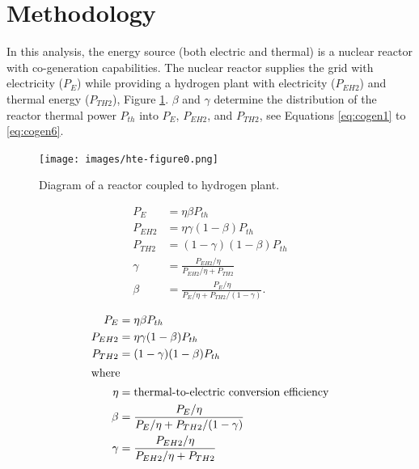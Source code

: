\documentclass[11pt,letterpaper]{article}
\begin{document}
\section{Methodology}
\label{sec:metho}

In this analysis, the energy source (both electric and thermal) is a nuclear reactor with co-generation capabilities.
The nuclear reactor supplies the grid with electricity ($P_E$) while providing a hydrogen plant with electricity ($P_{EH2}$) and thermal energy ($P_{TH2}$), Figure \ref{fig:cogen}.
$\beta$ and $\gamma$ determine the distribution of the reactor thermal power $P_{th}$ into $P_E$, $P_{EH2}$, and $P_{TH2}$, see Equations \ref{eq:cogen1} to \ref{eq:cogen6}.

\begin{figure}[htbp!]
	\centering
	\texttt{[image: images/hte-figure0.png]}
	\hfill
	\caption{Diagram of a reactor coupled to hydrogen plant.}
	\label{fig:cogen}
\end{figure}

\begin{equation}
\begin{split}
P_{E} &= \eta \beta P_{th}
\\
P_{EH2} &= \eta \gamma (1-\beta) P_{th}
\\
P_{TH2} &= (1-\gamma) (1-\beta) P_{th}
\\
\gamma &= \frac{P_{EH2} / \eta}{P_{EH2} / \eta + P_{TH2}}
\\
\beta &= \frac{P_{E} / \eta}{P_{E} / \eta + P_{TH2}/(1-\gamma)}.
\end{split}
\label{eq:hydro}
\end{equation}

\begin{align}
	P_{E} &= \eta \beta P_{th} \\
	\label{eq:cogen1}

	P_{EH2} &= \eta \gamma (1-\beta) P_{th}\\
	\label{eq:cogen2}

	P_{TH2} &= (1-\gamma) (1-\beta) P_{th}\\
	\label{eq:cogen3}

	\intertext{where}
    \eta &= \mbox{thermal-to-electric conversion efficiency} \\
	\label{eq:cogen4}

	\beta &= \frac{P_{E} / \eta}{P_{E} / \eta + P_{TH2}/(1-\gamma)}\\
	\label{eq:cogen5}

	\gamma &= \frac{P_{EH2} / \eta}{P_{EH2} / \eta + P_{TH2}}\\
	\label{eq:cogen6}
\end{align}
\end{document}
